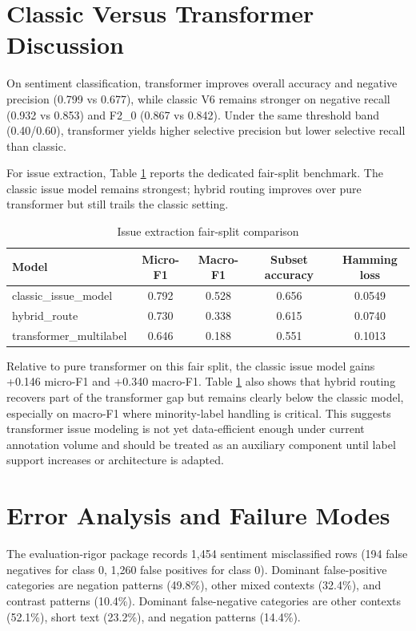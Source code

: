 \documentclass[12pt,a4paper]{article}
\begin{document}
\section{Classic Versus Transformer Discussion}
On sentiment classification, transformer improves overall accuracy and negative precision (0.799 vs 0.677), while classic V6 remains stronger on negative recall (0.932 vs 0.853) and F2\_0 (0.867 vs 0.842). Under the same threshold band (0.40/0.60), transformer yields higher selective precision but lower selective recall than classic.

For issue extraction, Table \ref{tab:issue_fair} reports the dedicated fair-split benchmark. The classic issue model remains strongest; hybrid routing improves over pure transformer but still trails the classic setting.

\begin{table}[H]
\centering
\caption{Issue extraction fair-split comparison}
\label{tab:issue_fair}
\begin{tabular}{lcccc}
\toprule
Model & Micro-F1 & Macro-F1 & Subset accuracy & Hamming loss \\
\midrule
classic\_issue\_model & 0.792 & 0.528 & 0.656 & 0.0549 \\
hybrid\_route & 0.730 & 0.338 & 0.615 & 0.0740 \\
transformer\_multilabel & 0.646 & 0.188 & 0.551 & 0.1013 \\
\bottomrule
\end{tabular}
\end{table}

Relative to pure transformer on this fair split, the classic issue model gains +0.146 micro-F1 and +0.340 macro-F1.
Table \ref{tab:issue_fair} also shows that hybrid routing recovers part of the transformer gap but remains clearly below the classic model, especially on macro-F1 where minority-label handling is critical. This suggests transformer issue modeling is not yet data-efficient enough under current annotation volume and should be treated as an auxiliary component until label support increases or architecture is adapted.

\section{Error Analysis and Failure Modes}
The evaluation-rigor package records 1,454 sentiment misclassified rows (194 false negatives for class 0, 1,260 false positives for class 0). Dominant false-positive categories are negation patterns (49.8\%), other mixed contexts (32.4\%), and contrast patterns (10.4\%). Dominant false-negative categories are other contexts (52.1\%), short text (23.2\%), and negation patterns (14.4\%).
\end{document}
